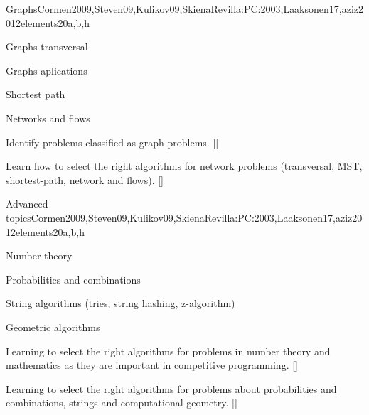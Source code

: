 \begin{syllabus}
  \begin{unit}{Graphs}{}{Cormen2009,Steven09,Kulikov09,SkienaRevilla:PC:2003,Laaksonen17,aziz2012elements}{20}{a,b,h}
    \begin{topics}
      \item Graphs transversal 
      \item Graphs aplications 
      \item Shortest path
      \item Networks and flows
    \end{topics}
    \begin{learningoutcomes}
        \item Identify problems classified as graph problems. [\Usage]
        \item Learn how to select the right algorithms for network problems (transversal, MST, shortest-path, network and flows). [\Usage]
    \end{learningoutcomes}
  \end{unit}
  
  \begin{unit}{Advanced topics}{}{Cormen2009,Steven09,Kulikov09,SkienaRevilla:PC:2003,Laaksonen17,aziz2012elements}{20}{a,b,h}
    \begin{topics}
      \item Number theory 
      \item Probabilities and combinations 
      \item String algorithms (tries, string hashing, z-algorithm)
      \item Geometric algorithms
    \end{topics}
    \begin{learningoutcomes}
        \item Learning to select the right algorithms for problems in number theory and mathematics as they are important in competitive programming. [\Usage]
        \item Learning to select the right algorithms for problems about probabilities and combinations, strings and computational geometry. [\Usage]
    \end{learningoutcomes}
  \end{unit}
  

\end{syllabus}
